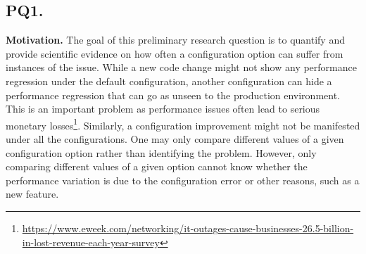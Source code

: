 \subsection*{\textbf{PQ1. \PQI}}
\label{sec:rq1}
\noindent \textbf{Motivation.}
The goal of this preliminary research question is to quantify and provide scientific evidence on how often a configuration option can suffer from instances of the \inconsistent issue. %
While a new code change might not show any performance regression under the default configuration, another configuration can hide a performance regression that can go as unseen to the production environment. This is an important problem as performance issues often lead to serious monetary losses\footnote{\url{https://www.eweek.com/networking/it-outages-cause-businesses-26.5-billion-in-lost-revenue-each-year-survey}}. Similarly, a configuration improvement might not be manifested under all the configurations. 
One may only compare different values of a given configuration option rather than identifying the \inconsistent problem. However, only comparing different values of a given option cannot know whether the performance variation is due to the configuration error or other reasons, such as a new feature. %

